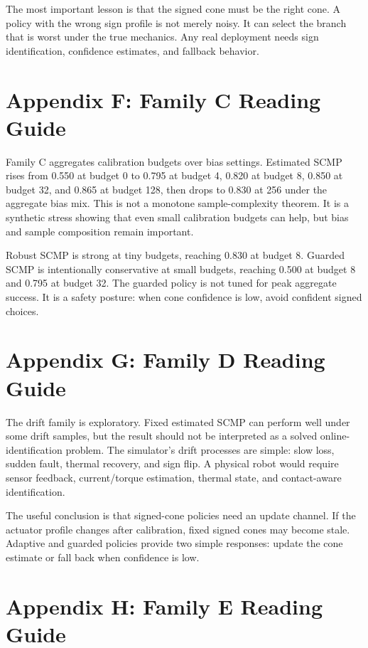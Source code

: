 \documentclass{article}
\begin{document}
The most important lesson is that the signed cone must be the right cone. A policy with the wrong sign profile is not merely noisy. It can select the branch that is worst under the true mechanics. Any real deployment needs sign identification, confidence estimates, and fallback behavior.

\section{Appendix F: Family C Reading Guide}

Family C aggregates calibration budgets over bias settings. Estimated SCMP rises from 0.550 at budget 0 to 0.795 at budget 4, 0.820 at budget 8, 0.850 at budget 32, and 0.865 at budget 128, then drops to 0.830 at 256 under the aggregate bias mix. This is not a monotone sample-complexity theorem. It is a synthetic stress showing that even small calibration budgets can help, but bias and sample composition remain important.

Robust SCMP is strong at tiny budgets, reaching 0.830 at budget 8. Guarded SCMP is intentionally conservative at small budgets, reaching 0.500 at budget 8 and 0.795 at budget 32. The guarded policy is not tuned for peak aggregate success. It is a safety posture: when cone confidence is low, avoid confident signed choices.

\section{Appendix G: Family D Reading Guide}

The drift family is exploratory. Fixed estimated SCMP can perform well under some drift samples, but the result should not be interpreted as a solved online-identification problem. The simulator's drift processes are simple: slow loss, sudden fault, thermal recovery, and sign flip. A physical robot would require sensor feedback, current/torque estimation, thermal state, and contact-aware identification.

The useful conclusion is that signed-cone policies need an update channel. If the actuator profile changes after calibration, fixed signed cones may become stale. Adaptive and guarded policies provide two simple responses: update the cone estimate or fall back when confidence is low.

\section{Appendix H: Family E Reading Guide}
\end{document}
